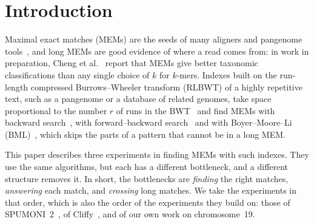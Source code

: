 \section{Introduction}
\label{sec:intro}

Maximal exact matches (MEMs) are the seeds of many aligners and pangenome tools~\cite{RossiEtAl2022,VarkiEtAl2025}, and long MEMs are good evidence of where a read comes from: in work in preparation, Cheng et al.~\cite{CALL} report that MEMs give better taxonomic classifications than any single choice of $k$ for $k$-mers.
Indexes built on the run-length compressed Burrows--Wheeler transform (RLBWT) of a highly repetitive text, such as a pangenome or a database of related genomes, take space proportional to the number $r$ of runs in the BWT~\cite{Navarro2021} and find MEMs with backward search~\cite{FerraginaManzini2000}, with forward--backward search~\cite{Li2012} and with Boyer--Moore--Li (BML)~\cite{Gagie2024BML,Li2024}, which skips the parts of a pattern that cannot be in a long MEM.

This paper describes three experiments in finding MEMs with such indexes.
They use the same algorithms, but each has a different bottleneck, and a different structure removes it.
In short, the bottlenecks are \emph{finding} the right matches, \emph{answering} each match, and \emph{crossing} long matches.
We take the experiments in that order, which is also the order of the experiments they build on: those of SPUMONI~2~\cite{AhmedEtAl2023}, of Cliffy~\cite{ABL25}, and of our own work on chromosome~19.

